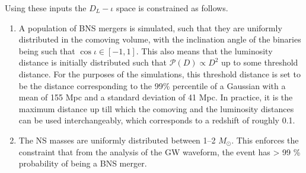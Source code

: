     Using these inputs the $D_L-\iota$ space is constrained as follows.
    \begin{enumerate}

        \item A population of BNS mergers is simulated, such that they are uniformly
            distributed in the comoving volume, with the inclination angle of the
            binaries being such that $\cos \iota \in [-1, 1]$. This also means that the
            luminosity distance is initially distributed such that $\mathcal{P}(D)
            \propto D^2$ up to some threshold distance. For the purposes of the
            simulations, this threshold distance is set to be the distance corresponding
            to the 99\% percentile of a Gaussian with a mean of 155 Mpc and a standard
            deviation of 41 Mpc. In practice, it is the maximum distance up till which
            the comoving and the luminosity distances can be used interchangeably, which
            corresponds to a redshift of roughly 0.1.

        \item The NS masses are uniformly distributed between 1--2 $M_{\odot}$. This
            enforces the constraint that from the analysis of the GW waveform, the event
            has > 99 \% probability of being a BNS merger.


\end{enumerate}
